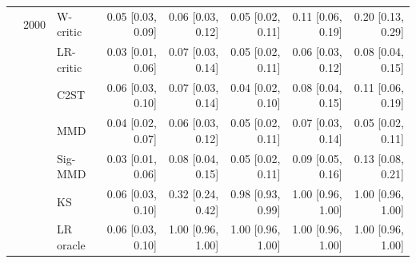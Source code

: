 \begin{tabular}{lllrrrrr}
 & 2000 & W-critic & 0.05 [0.03, 0.09] & 0.06 [0.03, 0.12] & 0.05 [0.02, 0.11] & 0.11 [0.06, 0.19] & 0.20 [0.13, 0.29] \\
 &  & LR-critic & 0.03 [0.01, 0.06] & 0.07 [0.03, 0.14] & 0.05 [0.02, 0.11] & 0.06 [0.03, 0.12] & 0.08 [0.04, 0.15] \\
 &  & C2ST & 0.06 [0.03, 0.10] & 0.07 [0.03, 0.14] & 0.04 [0.02, 0.10] & 0.08 [0.04, 0.15] & 0.11 [0.06, 0.19] \\
 &  & MMD & 0.04 [0.02, 0.07] & 0.06 [0.03, 0.12] & 0.05 [0.02, 0.11] & 0.07 [0.03, 0.14] & 0.05 [0.02, 0.11] \\
 &  & Sig-MMD & 0.03 [0.01, 0.06] & 0.08 [0.04, 0.15] & 0.05 [0.02, 0.11] & 0.09 [0.05, 0.16] & 0.13 [0.08, 0.21] \\
 &  & KS & 0.06 [0.03, 0.10] & 0.32 [0.24, 0.42] & 0.98 [0.93, 0.99] & 1.00 [0.96, 1.00] & 1.00 [0.96, 1.00] \\
 &  & LR oracle & 0.06 [0.03, 0.10] & 1.00 [0.96, 1.00] & 1.00 [0.96, 1.00] & 1.00 [0.96, 1.00] & 1.00 [0.96, 1.00] \\
\bottomrule
\end{tabular}
